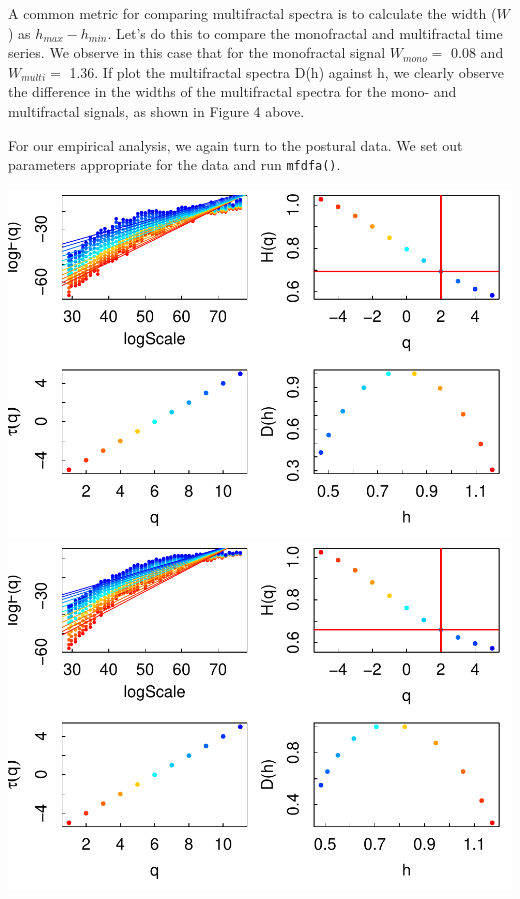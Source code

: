 \documentclass[
  man]{apa6}
\begin{document}
A common metric for comparing multifractal spectra is to calculate the
width (\(W\)) as \(h_{max} - h_{min}\). Let's do this to compare the
monofractal and multifractal time series. We observe in this case that
for the monofractal signal \(W_{mono} =\)
0.08 and \(W_{multi} =\)
1.36. If plot the
multifractal spectra D(h) against h, we clearly observe the difference
in the widths of the multifractal spectra for the mono- and multifractal
signals, as shown in Figure 4 above.

For our empirical analysis, we again turn to the postural data. We set
out parameters appropriate for the data and run \texttt{mfdfa()}.

\includegraphics{fractal_regression_paper_brm_files/figure-latex/unnamed-chunk-12-1.pdf} \includegraphics{fractal_regression_paper_brm_files/figure-latex/unnamed-chunk-12-2.pdf}
\end{document}
